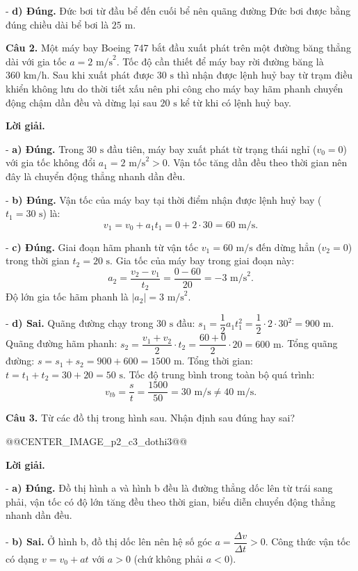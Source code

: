 \documentclass[11pt,a4paper]{article}
\begin{document}
- \textbf{d) Đúng.} Đức bơi từ đầu bể đến cuối bể nên quãng đường Đức bơi được bằng đúng chiều dài bể bơi là $25\text{ m}$.

\textbf{Câu 2.} Một máy bay Boeing 747 bắt đầu xuất phát trên một đường băng thẳng dài với gia tốc $a = 2\text{ m/s}^2$. Tốc độ cần thiết để máy bay rời đường băng là $360\text{ km/h}$. Sau khi xuất phát được $30\text{ s}$ thì nhận được lệnh huỷ bay từ trạm điều khiển không lưu do thời tiết xấu nên phi công cho máy bay hãm phanh chuyển động chậm dần đều và dừng lại sau $20\text{ s}$ kể từ khi có lệnh huỷ bay.

\textbf{Lời giải.} 

- \textbf{a) Đúng.} Trong $30\text{ s}$ đầu tiên, máy bay xuất phát từ trạng thái nghỉ ($v_0 = 0$) với gia tốc không đổi $a_1 = 2\text{ m/s}^2 > 0$. Vận tốc tăng dần đều theo thời gian nên đây là chuyển động thẳng nhanh dần đều.

- \textbf{b) Đúng.} Vận tốc của máy bay tại thời điểm nhận được lệnh huỷ bay ($t_1 = 30\text{ s}$) là:
\[
v_1 = v_0 + a_1 t_1 = 0 + 2 \cdot 30 = 60\text{ m/s}.
\]

- \textbf{c) Đúng.} Giai đoạn hãm phanh từ vận tốc $v_1 = 60\text{ m/s}$ đến dừng hẳn ($v_2 = 0$) trong thời gian $t_2 = 20\text{ s}$. Gia tốc của máy bay trong giai đoạn này:
\[
a_2 = \frac{v_2 - v_1}{t_2} = \frac{0 - 60}{20} = -3\text{ m/s}^2.
\]
Độ lớn gia tốc hãm phanh là $|a_2| = 3\text{ m/s}^2$.

- \textbf{d) Sai.} Quãng đường chạy trong $30\text{ s}$ đầu: $s_1 = \dfrac{1}{2} a_1 t_1^2 = \dfrac{1}{2} \cdot 2 \cdot 30^2 = 900\text{ m}$.
Quãng đường hãm phanh: $s_2 = \dfrac{v_1 + v_2}{2} \cdot t_2 = \dfrac{60 + 0}{2} \cdot 20 = 600\text{ m}$.
Tổng quãng đường: $s = s_1 + s_2 = 900 + 600 = 1500\text{ m}$.
Tổng thời gian: $t = t_1 + t_2 = 30 + 20 = 50\text{ s}$.
Tốc độ trung bình trong toàn bộ quá trình:
\[
v_{tb} = \frac{s}{t} = \frac{1500}{50} = 30\text{ m/s} \ne 40\text{ m/s}.
\]

\textbf{Câu 3.} Từ các đồ thị trong hình sau. Nhận định sau đúng hay sai?

@@CENTER_IMAGE_p2_c3_dothi3@@

\textbf{Lời giải.} 

- \textbf{a) Đúng.} Đồ thị hình a và hình b đều là đường thẳng dốc lên từ trái sang phải, vận tốc có độ lớn tăng đều theo thời gian, biểu diễn chuyển động thẳng nhanh dần đều.

- \textbf{b) Sai.} Ở hình b, đồ thị dốc lên nên hệ số góc $a = \dfrac{\Delta v}{\Delta t} > 0$. Công thức vận tốc có dạng $v = v_0 + at$ với $a > 0$ (chứ không phải $a < 0$).
\end{document}
